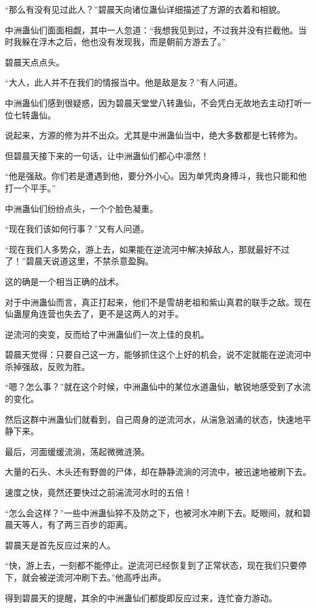 \begin{this_body}
“那么有没有见过此人？”碧晨天向诸位蛊仙详细描述了方源的衣着和相貌。

中洲蛊仙们面面相觑，其中一人忽道：“我想我见到过，不过我并没有拦截他。当时我躲在浮木之后，他也没有发现我，而是朝前方游去了。”

碧晨天点点头。

“大人，此人并不在我们的情报当中。他是敌是友？”有人问道。

中洲蛊仙们感到很疑惑，因为碧晨天堂堂八转蛊仙，不会凭白无故地去主动打听一位七转蛊仙。

说起来，方源的修为并不出众。尤其是中洲蛊仙当中，绝大多数都是七转修为。

但碧晨天接下来的一句话，让中洲蛊仙们都心中凛然！

“他是强敌。你们若是遭遇到他，要分外小心。因为单凭肉身搏斗，我也只能和他打一个平手。”

中洲蛊仙们纷纷点头，一个个脸色凝重。

“现在我们该如何行事？”又有人问道。

“现在我们人多势众，游上去，如果能在逆流河中解决掉敌人，那就最好不过了！”碧晨天说道这里，不禁杀意盈胸。

这的确是一个相当正确的战术。

对于中洲蛊仙而言，真正打起来，他们不是雪胡老祖和紫山真君的联手之敌。现在仙蛊屋角连营也失去了，更不是这两人的对手。

逆流河的突变，反而给了中洲蛊仙们一次上佳的良机。

碧晨天觉得：只要自己这一方，能够抓住这个上好的机会，说不定就能在逆流河中杀掉强敌，反败为胜。

“嗯？怎么事？”就在这个时候，中洲蛊仙中的某位水道蛊仙，敏锐地感受到了水流的变化。

然后这群中洲蛊仙们就看到，自己周身的逆流河水，从湍急汹涌的状态，快速地平静下来。

最后，河面缓缓流淌，荡起微微涟漪。

大量的石头、木头还有野兽的尸体，却在静静流淌的河流中，被迅速地被刷下去。

速度之快，竟然还要快过之前湍流河水时的五倍！

“怎么会这样？”一些中洲蛊仙猝不及防之下，也被河水冲刷下去。眨眼间，就和碧晨天等人，有了两三百步的距离。

碧晨天是首先反应过来的人。

“快，游上去，一刻都不能停止。逆流河已经恢复到了正常状态，现在我们只要停下，就会被逆流河冲刷下去。”他高呼出声。

得到碧晨天的提醒，其余的中洲蛊仙们都旋即反应过来，连忙奋力游动。


\end{this_body}
